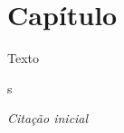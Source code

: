 \chapter{Capítulo}
\begin{flushright}
\begin{scriptsize}
Texto
\end{scriptsize}
\vspace{1cm}s

\emph{Citação inicial}
\end{flushright}